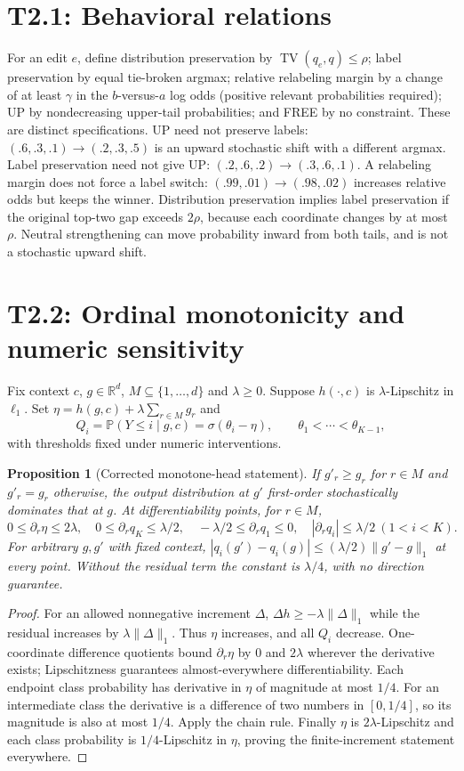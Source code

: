 \documentclass[11pt]{article}
\newtheorem{proposition}{Proposition}
\newcommand{\Prob}{\mathbb P}
\newcommand{\R}{\mathbb R}
\newcommand{\TV}{\operatorname{TV}}
\begin{document}
\section{T2.1: Behavioral relations}
For an edit $e$, define distribution preservation by
$\TV(q_e,q)\le\rho$; label preservation by equal tie-broken argmax;
relative relabeling margin by a change of at least $\gamma$ in the
$b$-versus-$a$ log odds (positive relevant probabilities required);
UP by nondecreasing upper-tail probabilities; and FREE by no constraint.
These are distinct specifications.
UP need not preserve labels: $(.6,.3,.1)\to(.2,.3,.5)$ is an upward
stochastic shift with a different argmax. Label preservation need not
give UP: $(.2,.6,.2)\to(.3,.6,.1)$. A relabeling margin does not force
a label switch: $(.99,.01)\to(.98,.02)$ increases relative odds but keeps
the winner. Distribution preservation implies label preservation if the
original top-two gap exceeds $2\rho$, because each coordinate changes by
at most $\rho$. Neutral strengthening can move probability inward from
both tails, and is not a stochastic upward shift.

\section{T2.2: Ordinal monotonicity and numeric sensitivity}
Fix context $c$, $g\in\R^d$, $M\subseteq\{1,\ldots,d\}$ and
$\lambda\ge0$. Suppose $h(\cdot,c)$ is $\lambda$-Lipschitz in $\ell_1$.
Set $\eta=h(g,c)+\lambda\sum_{r\in M}g_r$ and
\[
Q_i=\Prob(Y\le i\mid g,c)=\sigma(\theta_i-\eta),\qquad
\theta_1<\cdots<\theta_{K-1},
\]
with thresholds fixed under numeric interventions.

\begin{proposition}[Corrected monotone-head statement]
If $g'_r\ge g_r$ for $r\in M$ and $g'_r=g_r$ otherwise, the output
distribution at $g'$ first-order stochastically dominates that at $g$.
At differentiability points, for $r\in M$,
\[
0\le\partial_r\eta\le2\lambda,\quad
0\le\partial_rq_K\le\lambda/2,\quad
-\lambda/2\le\partial_rq_1\le0,\quad
|\partial_rq_i|\le\lambda/2\ (1<i<K).
\]
For arbitrary $g,g'$ with fixed context,
$|q_i(g')-q_i(g)|\le(\lambda/2)\|g'-g\|_1$ at every point.
Without the residual term the constant is $\lambda/4$, with no direction
guarantee.
\end{proposition}
\begin{proof}
For an allowed nonnegative increment $\Delta$,
$\Delta h\ge-\lambda\|\Delta\|_1$ while the residual increases by
$\lambda\|\Delta\|_1$. Thus $\eta$ increases, and all $Q_i$ decrease.
One-coordinate difference quotients bound $\partial_r\eta$ by $0$ and
$2\lambda$ wherever the derivative exists; Lipschitzness guarantees
almost-everywhere differentiability. Each endpoint class probability
has derivative in $\eta$ of magnitude at most $1/4$. For an intermediate
class the derivative is a difference of two numbers in $[0,1/4]$, so
its magnitude is also at most $1/4$. Apply the chain rule. Finally $\eta$
is $2\lambda$-Lipschitz and each class probability is $1/4$-Lipschitz
in $\eta$, proving the finite-increment statement everywhere.
\end{proof}
\end{document}
